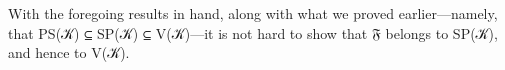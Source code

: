 \documentclass[a4paper,UKenglish,cleveref,autoref,thm-restate]{lipics-v2021}
\begin{document}
With the foregoing results in hand, along with what we proved earlier---namely, that \ad P\ad S(\ab 𝒦) \af ⊆ \ad S\ad P(\ab 𝒦) \af ⊆ \ad V(\ab 𝒦)---it is not hard to show that \af 𝔉 belongs to \ad S\ad P(\ab 𝒦), and hence to \ad V(\ab 𝒦).
\ccpad
\begin{code}%
\>[1]\AgdaSpace{}%
\AgdaSymbol{:}\AgdaSpace{}%
\AgdaSpace{}%
\AgdaSpace{}%
\AgdaSpace{}%
\AgdaSpace{}%
\AgdaSpace{}%
\AgdaSpace{}%
\AgdaSpace{}%
\AgdaSymbol{(}\AgdaSymbol{\{}\AgdaSymbol{\}\{}\AgdaSymbol{\}}\AgdaSpace{}%
\AgdaSymbol{(}\AgdaSymbol{\{}\AgdaSymbol{\}\{}\AgdaSymbol{\}}\AgdaSpace{}%
\AgdaSymbol{))}\<%
\\
%
\>[1]\AgdaSpace{}%
\AgdaSpace{}%
\AgdaSymbol{=}\AgdaSpace{}%
\AgdaSpace{}%
\AgdaSpace{}%
\AgdaSymbol{(}\AgdaSpace{}%
\AgdaSymbol{)}\<%
\\
\>[1][@{}l@{\AgdaIndent{0}}]%
\>[2]\<%
\\
\>[2][@{}l@{\AgdaIndent{0}}]%
\>[3]\AgdaSpace{}%
\AgdaSymbol{:}\AgdaSpace{}%
\AgdaSpace{}%
\AgdaSpace{}%
\AgdaSymbol{(}\AgdaSymbol{\{}\AgdaSymbol{\}\{}\AgdaSymbol{\}}\AgdaSpace{}%
\AgdaSymbol{(}\AgdaSymbol{\{}\AgdaSymbol{\}\{}\AgdaSymbol{\}}\AgdaSpace{}%
\AgdaSymbol{))}\<%
\\
%
\>[3]\AgdaSpace{}%
\AgdaSymbol{=}\AgdaSpace{}%
\AgdaSymbol{(}\AgdaSpace{}%
\AgdaSymbol{)}\<%
\\
%
\\[\AgdaEmptyExtraSkip]%
%
\>[1]\AgdaSpace{}%
\AgdaSymbol{:}\AgdaSpace{}%
\AgdaSpace{}%
\AgdaSpace{}%
\AgdaSpace{}%
\AgdaSpace{}%
\AgdaSpace{}%
\AgdaSpace{}%
\AgdaSpace{}%
\<%
\\
%
\>[1]\AgdaSpace{}%
\AgdaSpace{}%
\AgdaSymbol{=}\AgdaSpace{}%
\AgdaSpace{}%
\AgdaSymbol{(}\AgdaSpace{}%
\AgdaSymbol{)}\<%
\end{code}
\end{document}
